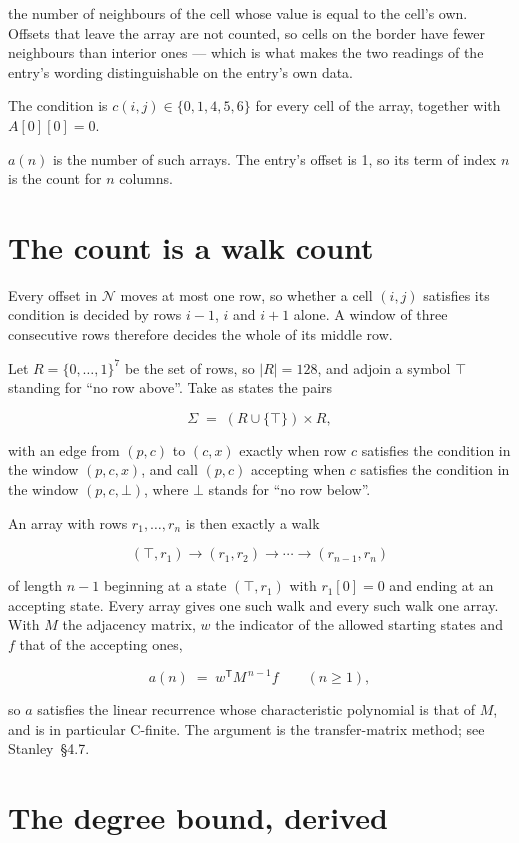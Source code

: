 \documentclass[11pt]{article}
\theoremstyle{definition}
\begin{document}
the number of neighbours of the cell whose value is equal to the cell's own. Offsets that leave the array are not counted, so cells on the border have fewer neighbours than interior ones --- which is what makes the two readings of the entry's wording distinguishable on the entry's own data.

The condition is $c(i,j) \in \{0, 1, 4, 5, 6\}$ for every cell of the array, together with $A[0][0]=0$.

$a(n)$ is the number of such arrays. The entry's offset is 1, so its term of index $n$ is the count for $n$ columns.

\section{The count is a walk count}

Every offset in $\mathcal{N}$ moves at most one row, so whether a cell $(i,j)$ satisfies its condition is decided by rows $i-1$, $i$ and $i+1$ alone. A window of three consecutive rows therefore decides the whole of its middle row.

Let $R = \{0,\dots,1\}^{7}$ be the set of rows, so $|R| = 128$, and adjoin a symbol $\top$ standing for ``no row above''. Take as states the pairs

\[\Sigma \;=\; (R \cup \{\top\}) \times R,\]

with an edge from $(p,c)$ to $(c,x)$ exactly when row $c$ satisfies the condition in the window $(p,c,x)$, and call $(p,c)$ accepting when $c$ satisfies the condition in the window $(p,c,\bot)$, where $\bot$ stands for ``no row below''.

An array with rows $r_1,\dots,r_n$ is then exactly a walk

\[(\top,r_1) \to (r_1,r_2) \to \cdots \to (r_{n-1},r_n)\]

of length $n-1$ beginning at a state $(\top,r_1)$ with $r_1[0]=0$ and ending at an accepting state. Every array gives one such walk and every such walk one array. With $M$ the adjacency matrix, $w$ the indicator of the allowed starting states and $f$ that of the accepting ones,

\[a(n) \;=\; w^{\mathsf T} M^{\,n-1} f \qquad (n \ge 1),\]

so $a$ satisfies the linear recurrence whose characteristic polynomial is that of $M$, and is in particular C-finite. The argument is the transfer-matrix method; see Stanley~\S4.7.

\section{The degree bound, derived}
\end{document}

